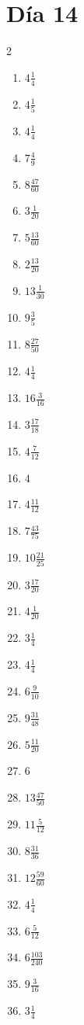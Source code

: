 \documentclass[12pt]{article}
\begin{document}
\section*{Día 14}
\begin{multicols}{2}\begin{enumerate}
\item $ 4 \frac{1}{4} $
\item $ 4 \frac{1}{5} $
\item $ 4 \frac{1}{4} $
\item $ 7 \frac{4}{9} $
\item $ 8 \frac{47}{60} $
\item $ 3 \frac{1}{20} $
\item $ 5 \frac{13}{60} $
\item $ 2 \frac{13}{20} $
\item $ 13 \frac{1}{30} $
\item $ 9 \frac{3}{5} $
\item $ 8 \frac{27}{50} $
\item $ 4 \frac{1}{4} $
\item $ 16 \frac{3}{16} $
\item $ 3 \frac{17}{18} $
\item $ 4 \frac{7}{12} $
\item $ 4 $
\item $ 4 \frac{11}{12} $
\item $ 7 \frac{43}{75} $
\item $ 10 \frac{21}{25} $
\item $ 3 \frac{17}{20} $
\item $ 4 \frac{1}{20} $
\item $ 3 \frac{1}{4} $
\item $ 4 \frac{1}{4} $
\item $ 6 \frac{9}{10} $
\item $ 9 \frac{31}{48} $
\item $ 5 \frac{11}{20} $
\item $ 6 $
\item $ 13 \frac{47}{50} $
\item $ 11 \frac{5}{12} $
\item $ 8 \frac{31}{36} $
\item $ 12 \frac{59}{60} $
\item $ 4 \frac{1}{4} $
\item $ 6 \frac{5}{12} $
\item $ 6 \frac{103}{240} $
\item $ 9 \frac{3}{16} $
\item $ 3 \frac{1}{4} $

\end{enumerate}
\end{multicols}
\end{document}
